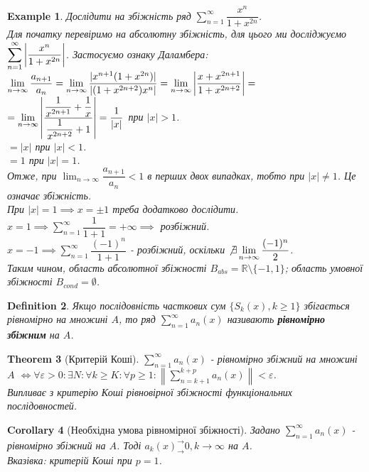 \documentclass[a4paper, 10pt]{article}
\def\huge{\displaystyle}
\theoremstyle{theoremdd}
\newtheorem{theorem}{Theorem}[subsection]
\theoremstyle{theoremdd}
\newtheorem{definition}[theorem]{Definition}
\theoremstyle{theoremdd}
\theoremstyle{theoremdd}
\newtheorem{example}[theorem]{Example}
\theoremstyle{theoremdd}
\theoremstyle{theoremdd}
\theoremstyle{theoremdd}
\theoremstyle{theoremdd}
\newtheorem{corollary}[theorem]{Corollary}
\begin{document}
\begin{example}
Дослідити на збіжність ряд $\huge\sum_{n=1}^\infty \dfrac{x^n}{1+x^{2n}}$.\\
Для початку перевіримо на абсолютну збіжність, для цього ми досліджуємо $\huge\sum_{n=1}^\infty \abs{\dfrac{x^n}{1+x^{2n}}}$. Застосуємо ознаку Даламбера:\\
$\huge\lim_{n \to \infty} \dfrac{a_{n+1}}{a_n} = \lim_{n \to \infty} \dfrac{|x^{n+1}(1+x^{2n})|}{|(1+x^{2n+2})x^n|} = \lim_{n \to \infty} \abs{ \dfrac{x+x^{2n+1}}{1+x^{2n+2}} } = $\\
$= \huge\lim_{n \to \infty} \abs{ \dfrac{\dfrac{1}{x^{2n+1}} + \dfrac{1}{x}}{\dfrac{1}{x^{2n+2}} + 1}} = \dfrac{1}{|x|}$ при $|x|>1$.\\
$= |x|$ при $|x| < 1$.\\
$= 1$ при $|x| = 1$.\\
Отже, при $\huge\lim_{n \to \infty} \dfrac{a_{n+1}}{a_n} < 1$ в перших двох випадках, тобто при $|x| \neq 1$. Це означає збіжність.\\
При $|x| = 1 \implies x = \pm 1$ треба додатково дослідити.\\
$x = 1 \implies \huge\sum_{n=1}^\infty \dfrac{1}{1+1} = +\infty \implies$ розбіжний.\\
$x = -1 \implies \huge\sum_{n=1}^\infty \dfrac{(-1)^n}{1+1}$ - розбіжний, оскільки $\not\exists \huge\lim_{n \to \infty} \dfrac{(-1)^n}{2}$.\\
Таким чином, область абсолютної збіжності $B_{abs} = \mathbb{R} \setminus \{-1,1\}$; область умовної збіжності $B_{cond} = \emptyset$.
\end{example}


\begin{definition}
Якщо послідовність часткових сум $\{S_k(x), k \geq 1\}$ збігається рівномірно на множині $A$, то ряд $\huge \sum_{n=1}^\infty a_n(x)$ називають \textbf{рівномірно збіжним} на $A$.
\end{definition}

\begin{theorem}[Критерій Коші]
$\huge \sum_{n=1}^\infty a_n(x)$ - рівномірно збіжний на множині $A$ $\iff \forall \varepsilon > 0: \exists N: \forall k \geq K: \forall p \geq 1: \left\lVert \huge\sum_{n=k+1}^{k+p} a_n(x)  \right\rVert < \varepsilon$.\\
\textit{Випливає з критерію Коші рівновірної збіжності функціональних послідовностей.}
\end{theorem}

\begin{corollary}[Необхідна умова рівномірної збіжності]
Задано $\huge\sum_{n=1}^\infty a_n(x)$ - рівномірно збіжний на $A$. Тоді $a_k(x)^\rightarrow_\rightarrow 0, k \to \infty$ на $A$.\\
\textit{Вказівка: критерій Коші при $p = 1$.}
\end{corollary}
\end{document}
